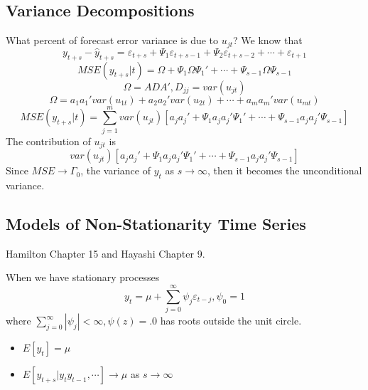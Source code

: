 \documentclass[11pt, a4paper, oneside]{article}
\theoremstyle{definition}
\theoremstyle{proposition}
\theoremstyle{corollary}
\theoremstyle{lemma}
\theoremstyle{theorem}
\begin{document}
\subsection{Variance Decompositions}
What percent of forecast error variance is due to $u_{jt}$? We know that
$$y_{t+s} - \hat{y}_{t+s} = \varepsilon_{t+s} + \Psi_1 \varepsilon_{t+s-1} +\Psi_2 \varepsilon_{t+s-2} +\cdots +\varepsilon_{t+1}$$
$$MSE(y_{t+s}|t) = \Omega + \Psi_1\Omega\Psi_1'+ \cdots+ \Psi_{s-1}\Omega \Psi_{s-1}$$
$$\Omega = ADA', D_{jj} = var(u_{jt})$$
$$\Omega = a_1a_1'var(u_{1t}) + a_2a_2' var(u_{2t}) + \cdots + a_ma_m'var(u_{mt})$$
$$MSE(y_{t+s}|t) = \sum_{j=1}^m var(u_{jt})[a_ja_j' + \Psi_1 a_ja_j' \Psi_1'+\cdots+\Psi_{s-1}a_ja_j'\Psi_{s-1}]$$
The contribution of $u_{jt}$ is $$var(u_{jt})[a_ja_j' + \Psi_1 a_ja_j' \Psi_1'+\cdots+\Psi_{s-1}a_ja_j'\Psi_{s-1}]$$
Since $MSE \to \Gamma_0$, the variance of $y_t$ as $s \to \infty$, then it becomes the unconditional variance. 

\subsection{Models of Non-Stationarity Time Series}
Hamilton Chapter 15 and Hayashi Chapter 9. 

When we have stationary processes 
$$y_{t} = \mu + \sum_{j=0}^{\infty} \psi_j\varepsilon_{t-j} , \psi_0 = 1$$
where $\sum_{j=0}^{\infty} | \psi_j | < \infty, \psi(z)=.0$ has roots outside the unit circle. 
\begin{itemize}
\item $E[y_t] = \mu$
\item $E[y_{t+s}|y_ty_{t-1}, \cdots] \to \mu$ as $s \to \infty$ 
\end{itemize}
\end{document}
